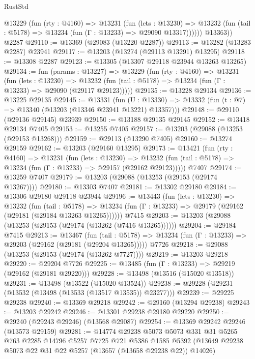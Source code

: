 \begin{lexlean}{RustStd}
\begin{coremodule}
          @13229
            (fun (rty : @4160) =>
            @13231
              (fun (lets : @13230) =>
              @13232 (fun (tail : @5178) => @13234 (fun (Γ : @13233) => @29090 @13317))))))
        @13363))
    @2287
@29110 := @13369 (@29083 (@13220 @2287))
@29113 := @13282 (@13283 @2287) @23941
@29117 := @13203 (@13274 (@29113 @13291) @13295)
@29118 := @13308 @2287
@29123 := @13305 (@13307 @29118 @23944 @13263 @13265)
@29134 := fun (params : @13227) =>
  @13229
    (fun (rty : @4160) =>
    @13231
      (fun (lets : @13230) =>
      @13232 (fun (tail : @5178) => @13234 (fun (Γ : @13233) => @29090 (@29117 @29123)))))
@29135 := @13228 @29134
@29136 := @13225 @29135
@29145 := @13331
    (fun (U : @13330) => @13332 (fun (t : @7) => @13340 (@13203 (@13346 @23941 @13221) @13357)))
@29148 := @29110 (@29136 @29145) @23939
@29150 := @13188 @29135 @29145
@29152 := @13418 @29134 @7405
@29153 := @13255 @7405
@29157 := @13203 (@29088 (@13253 (@29153 @13268)))
@29159 := @29113 (@13290 @7405)
@29160 := @13274 @29159
@29162 := @13203 (@29160 @13295)
@29173 := @13421
    (fun (rty : @4160) =>
    @13231
      (fun (lets : @13230) =>
      @13232 (fun (tail : @5178) => @13234 (fun (Γ : @13233) => @29157 (@29162 @29123)))))
    @7407
@29174 := @13259 @7407
@29179 := @13203 (@29088 (@13253 (@29153 (@29174 @13267))))
@29180 := @13303 @7407
@29181 := @13302 @29180
@29184 := @13306 @29180 @29118 @23944
@29196 := @13443
    (fun (lets : @13230) =>
    @13232
      (fun (tail : @5178) =>
      @13234 (fun (Γ : @13233) => @29179 (@29162 (@29181 (@29184 @13263 @13265))))))
    @7415
@29203 := @13203 (@29088 (@13253 (@29153 (@29174 (@13262 (@7416 @13265))))))
@29204 := @29184 @7415
@29213 := @13467
    (fun (tail : @5178) => @13234 (fun (Γ : @13233) => @29203 (@29162 (@29181 (@29204 @13265)))))
    @7726
@29218 := @29088 (@13253 (@29153 (@29174 (@13262 @7727))))
@29219 := @13203 @29218
@29220 := @29204 @7726
@29225 := @13485 (fun (Γ : @13233) => @29219 (@29162 (@29181 @29220)))
@29228 := @13498 (@13516 (@15020 @13518))
@29231 := @13498 (@13522 (@15020 @13524))
@29238 := @29228 (@29231 (@13532 (@13498 (@13533 (@13517 @13535)) @23277)))
@29239 := @29225 @29238
@29240 := @13369 @29218
@29242 := @29160 (@13294 @29238)
@29243 := @13203 @29242
@29246 := @13301 @29238 @29180 @29220
@29250 := @29240 (@29243 @29246) (@13568 @29087)
@29254 := @13369 @29242 @29246 (@13573 @29159)
@29281 := @14774
    @29238
    @5073
    @5073
    @331
    @31
    @5265
    @763
    @2285
    @14796
    @5257
    @7725
    @721
    @5386
    @1585
    @5392
    (@13649 @29238 @5073 @22 @31 @22 @5257 (@13657 (@13658 @29238 @22)) @14026)

\end{coremodule}
\end{lexlean}
